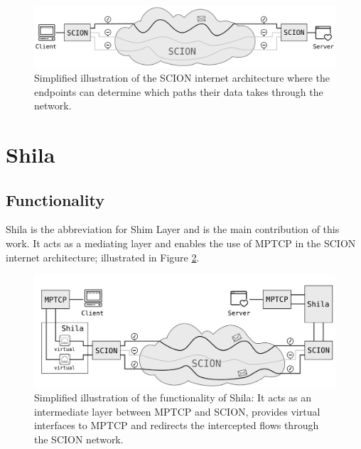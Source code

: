 \begin{figure}[H]
	\begin{center}
		\def\svgwidth{1\textwidth}
		\includegraphics[scale=0.28]{../illustrations/introduction/SCION.pdf}
		\caption[Caption for the list of figures.]{Simplified illustration of the SCION internet architecture where the endpoints can determine which paths their data takes through the network.}
		\label{fig:IntroSCION}
	\end{center}
\end{figure}

\section{Shila}

\subsection*{Functionality}

Shila is the abbreviation for Shim Layer and is the main contribution of this work. It acts as a mediating layer and enables the use of MPTCP in the SCION internet architecture; illustrated in Figure \ref{fig:IntroRoleOfShila}. 

\begin{figure}[H]
	\begin{center}
		\def\svgwidth{1\textwidth}
		\includegraphics[scale=0.28]{../illustrations/introduction/Shila.pdf} 
		\caption[Caption for the list of figures.]{Simplified illustration of the functionality of Shila: It acts as an intermediate layer between MPTCP and SCION, provides virtual interfaces to MPTCP and redirects the intercepted flows through the SCION network.}
		\label{fig:IntroRoleOfShila}
	\end{center}
\end{figure}

